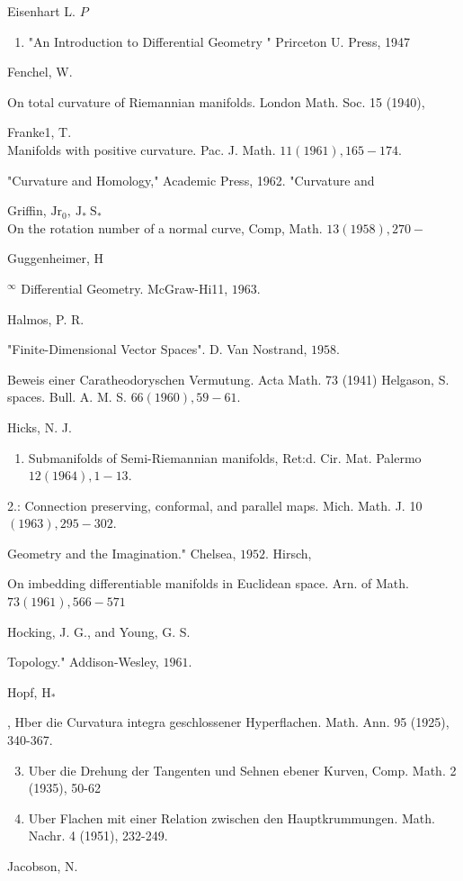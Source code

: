 \documentclass[10pt]{article}
\begin{document}
Eisenhart L. $P$

\begin{enumerate}
  \item "An Introduction to Differential Geometry " Prirceton U. Press, 1947
\end{enumerate}
Fenchel, W.

On total curvature of Riemannian manifolds. London Math. Soc. 15 (1940),

Franke1, T.\\
Manifolds with positive curvature. Pac. J. Math. $11(1961), 165-174 .$

"Curvature and Homology," Academic Press, 1962. "Curvature and

Griffin, $\mathrm{Jr}_{0}, \mathrm{~J}_{*} \mathrm{~S}_{*}$\\
On the rotation number of a normal curve, Comp, Math. $13(1958), 270-$

Guggenheimer, H

${ }^{\infty}$ Differential Geometry. McGraw-Hi11, $1963 .$

Halmos, P. R.

"Finite-Dimensional Vector Spaces". D. Van Nostrand, $1958 .$

Beweis einer Caratheodoryschen Vermutung. Acta Math. 73 (1941) Helgason, S. spaces. Bull. A. M. S. $66(1960), 59-61 .$

Hicks, N. J.

\begin{enumerate}
  \item Submanifolds of Semi-Riemannian manifolds, Ret:d. Cir. Mat. Palermo $12(1964), 1-13 .$
\end{enumerate}
2.: Connection preserving, conformal, and parallel maps. Mich. Math. J. 10 $(1963), 295-302 .$

Geometry and the Imagination." Chelsea, $1952 .$ Hirsch,

On imbedding differentiable manifolds in Euclidean space. Arn. of Math. $73(1961), 566-571$

Hocking, J. G., and Young, G. S.

Topology." Addison-Wesley, $1961 .$

Hopf, $\mathrm{H}_{\mathbf{*}}$

, Hber die Curvatura integra geschlossener Hyperflachen. Math. Ann. 95 (1925), 340-367.

\begin{enumerate}
  \setcounter{enumi}{2}
  \item Uber die Drehung der Tangenten und Sehnen ebener Kurven, Comp. Math. 2 (1935), 50-62

  \item Uber Flachen mit einer Relation zwischen den Hauptkrummungen. Math. Nachr. 4 (1951), 232-249.

\end{enumerate}
Jacobson, $\mathrm{N}$.
\end{document}
